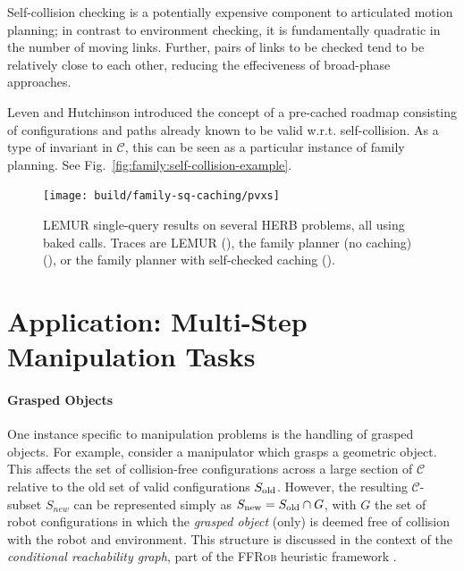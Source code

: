 Self-collision checking is a potentially expensive component to
articulated motion planning;
in contrast to environment checking,
it is fundamentally quadratic in the number of moving links.
Further, pairs of links to be checked
tend to be relatively close to each other,
reducing the effeciveness of broad-phase approaches.

Leven and Hutchinson \citep{leven2000changing}
introduced the concept of a pre-cached roadmap consisting of
configurations and paths already known to be valid w.r.t.
self-collision.
As a type of invariant in $\mathcal{C}$,
this can be seen as a particular instance of family planning.
See Fig.~\ref{fig:family:self-collision-example}.

\begin{figure}
   \centering   
   \texttt{[image: build/family-sq-caching/pvxs]}
   \caption[]{LEMUR single-query results on several HERB problems,
      all using baked calls.
      Traces are LEMUR
      (\protect{}),
      the family planner (no caching)
      (\protect{}),
      or the family planner with self-checked caching
      (\protect{}).}
\end{figure}

\section{Application: Multi-Step Manipulation Tasks}

\paragraph{Grasped Objects}
\label{subsec:family:grasped-objects}

One instance specific to manipulation problems is the handling of
grasped objects.
For example, 
consider a manipulator which grasps a geometric object.
This affects the set of collision-free configurations
across a large section of $\mathcal{C}$
relative to the old set of valid configurations $S_{\mbox{\scriptsize old}}$.
However,
the resulting $\mathcal{C}$-subset $S_{new}$
can be represented simply as
$S_{\mbox{\scriptsize new}} = S_{\mbox{\scriptsize old}} \cap G$,
with $G$ the set of robot configurations in which
the \emph{grasped object} (only)
is deemed free of collision with the robot and environment.
This structure is discussed in the context of the
\emph{conditional reachability graph},
part of the \textsc{FFRob} heuristic framework
\citep{garrett2014ffrob}.


